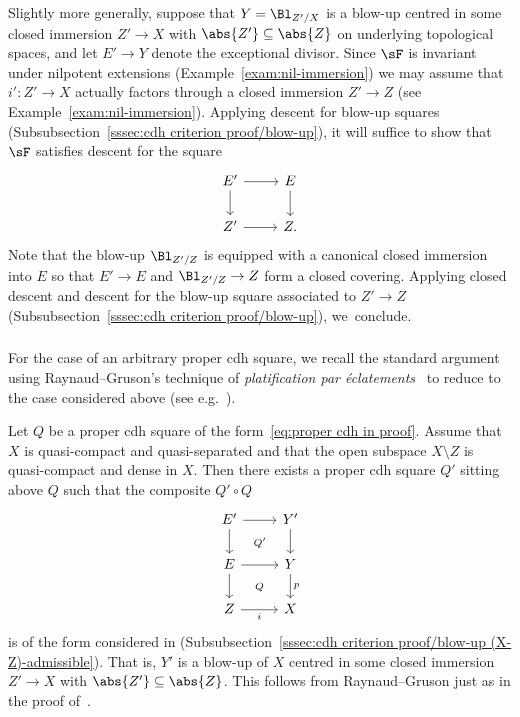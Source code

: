 Slightly more generally, suppose that $Y = \Bl_{Z'/X}$ is a blow-up centred in some closed immersion $Z' \to X$ with $\abs{Z'} \subseteq \abs{Z}$ on underlying topological spaces, and let $E' \to Y$ denote the exceptional divisor. Since $\sF$ is invariant under nilpotent extensions (Example~\ref{exam:nil-immersion}) we may assume that $i' : Z' \to X$ actually factors through a closed immersion $Z' \to Z$ (see Example~\ref{exam:nil-immersion}). Applying descent for blow-up squares (Subsubsection~\ref{sssec:cdh criterion proof/blow-up}), it will suffice to show that $\sF$ satisfies descent for the square
\[
\begin{tikzcd}
E' \ar{r}\ar{d} & E \ar{d}
\\
Z' \ar{r} & Z.
\end{tikzcd}
\]
Note that the blow-up $\Bl_{Z'/Z}$ is equipped with a canonical closed immersion into $E$ so that $E' \to E$ and $\Bl_{Z'/Z} \to Z$ form a closed covering. Applying closed descent and descent for the blow-up square associated to $Z' \to Z$ (Subsubsection~\ref{sssec:cdh criterion proof/blow-up}), we~conclude.

\subsubsection{}

For the case of an arbitrary proper cdh square, we recall the standard argument using Raynaud--Gruson's technique of \emph{platification par éclatements}~\cite[I, Corollary~5.7.12]{RaynaudGruson} to reduce to the case considered above (see e.g.~\cite[Subsection~5.2]{KerzStrunkTamme}).

\goodbreak
\begingroup
\begin{constr}\label{constr}
Let $Q$ be a proper cdh square of the form~\eqref{eq:proper cdh in proof}. Assume that $X$ is quasi-compact and quasi-separated and that the open subspace $X\setminus Z$ is quasi-compact and dense in $X$. Then there exists a proper cdh square $Q'$ sitting above $Q$ such that the composite $Q' \circ Q$
\[
\begin{tikzcd}
E' \ar{r}\ar{d}\ar[phantom]{rd}{\scriptstyle Q'} & Y' \ar{d}
\\
E \ar{r}\ar{d}\ar[phantom]{rd}{\scriptstyle Q} & Y \ar{d}{p}
\\
Z \ar[swap]{r}{i} & X
\end{tikzcd}
\]
is of the form considered in (Subsubsection~\ref{sssec:cdh criterion proof/blow-up (X-Z)-admissible}). That is, $Y'$ is a blow-up of $X$ centred in some closed immersion $Z' \to X$ with $\abs{Z'} \subseteq \abs{Z}$. This follows from Raynaud--Gruson just as in the proof of~\cite[Corollary~2.4]{HoyoisKrishna}.
\end{constr}
\endgroup

